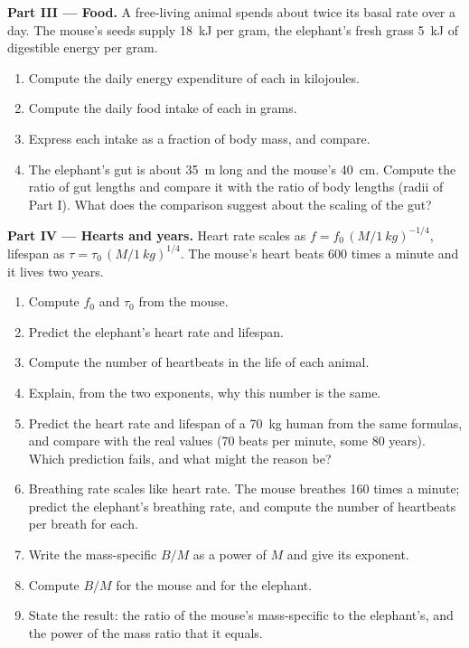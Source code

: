 \begin{problem}
\medskip
\noindent\textbf{Part III --- Food.}
A free-living animal spends about twice its basal rate over a day.
The mouse's seeds supply \qty{18}{kJ} per gram, the elephant's fresh
grass \qty{5}{kJ} of digestible energy per gram.
\begin{enumerate}[resume]
  \item Compute the daily energy expenditure of each in kilojoules.
  \item Compute the daily food intake of each in grams.
  \item Express each intake as a fraction of body mass, and compare.
  \item The elephant's gut is about \qty{35}{m} long and the mouse's
        \qty{40}{cm}. Compute the ratio of gut lengths and compare it
        with the ratio of body lengths (radii of Part I). What does
        the comparison suggest about the scaling of the gut?
\end{enumerate}

\medskip
\noindent\textbf{Part IV --- Hearts and years.}
Heart rate scales as $f = f_0\,(M/\qty{1}{kg})^{-1/4}$, lifespan as
$\tau = \tau_0\,(M/\qty{1}{kg})^{1/4}$. The mouse's heart beats
\qty{600}{} times a minute and it lives two years.
\begin{enumerate}[resume]
  \item Compute $f_0$ and $\tau_0$ from the mouse.
  \item Predict the elephant's heart rate and lifespan.
  \item Compute the number of heartbeats in the life of each animal.
  \item Explain, from the two exponents, why this number is the same.
  \item Predict the heart rate and lifespan of a \qty{70}{kg} human
        from the same formulas, and compare with the real values
        (\qty{70}{} beats per minute, some \qty{80}{} years). Which
        prediction fails, and what might the reason be?
  \item Breathing rate scales like heart rate. The mouse breathes
        \qty{160}{} times a minute; predict the elephant's breathing
        rate, and compute the number of heartbeats per breath for each.
  \item Write the mass-specific  $B/M$ as a power of $M$
        and give its exponent.
  \item Compute $B/M$ for the mouse and for the elephant.
  \item State the result: the ratio of the mouse's mass-specific
         to the elephant's, and the power of the mass
        ratio that it equals.
\end{enumerate}
\end{problem}
